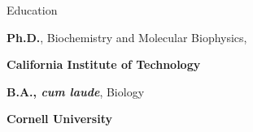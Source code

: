 \begin{rubric}{Education}

\entry*[2013--2018]
	\textbf{Ph.D.}, Biochemistry and Molecular Biophysics,
	\par \textbf{California Institute of Technology}

\entry*[2009--2013]%
	\textbf{B.A., \emph{cum laude}}, Biology
	\par \textbf{Cornell University}

\end{rubric}
